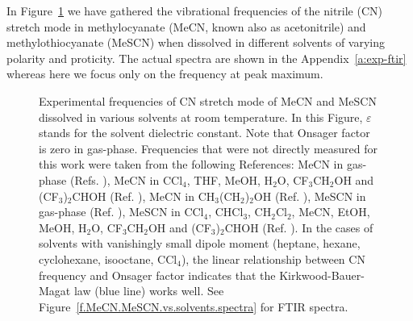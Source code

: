 \documentclass[b5paper,oneside,fleqn,11pt]{book}
\begin{document}
\begin{refsection}
In Figure~\ref{f.MeCN.MeSCN.vs.solvents} we have gathered the vibrational 
frequencies of the nitrile (CN) stretch mode in methylocyanate (MeCN, known also as acetonitrile) and methylothiocyanate
(MeSCN) when dissolved in different solvents of varying polarity and proticity. \citep{Blasiak.Ritchie.Webb.Cho.PCCP.2016}
The actual spectra are shown in the Appendix~\ref{a:exp-ftir} whereas here we focus only
on the frequency at peak maximum.
%
\begin{figure}[ht]
\centering
\setlength\fboxsep{0.4pt}
\setlength\fboxrule{0.5pt}
\caption{Experimental frequencies of CN stretch mode of MeCN and MeSCN dissolved in
various solvents at room temperature. In this Figure, $\varepsilon$
stands for the solvent dielectric constant. Note that Onsager factor is zero in gas-phase. 
Frequencies that were not directly measured for this work were taken from the following 
References: MeCN in gas\hyp{}phase 
(Refs. \citep{Koga.Kondo.Saeki.Person.JPC.1984,Cerceau.Raulin.Courtin.Gautier.Icarus.1985,
Parker.Nielsen.Fletcher.JMS.1957}), 
MeCN in CCl$_4$, THF, MeOH, H$_2$O, CF$_3$CH$_2$OH and 
(CF$_3$)$_2$CHOH (Ref. \citep{Eaton.Pena-Nunez.Symons.JChemSocFaradTrans1.1988}), 
MeCN in CH$_3$(CH$_2$)$_2$OH (Ref. \citep{Oh.Choi.Lee.Han.Lee.Cho.JCP.2008}), 
MeSCN in gas-phase (Ref. \citep{Sullivan.Heusel.Durig.JMS.1984}), MeSCN in 
CCl$_4$, CHCl$_3$, CH$_2$Cl$_2$, MeCN, EtOH, MeOH, H$_2$O, CF$_3$CH$_2$OH and (CF$_3$)$_2$CHOH 
(Ref. \citep{Maienschein-Cline.Londergan.JPCA.2007}). In the 
cases of solvents with vanishingly small dipole moment (heptane, hexane, cyclohexane, 
isooctane, CCl$_4$), the linear relationship between CN frequency and Onsager factor indicates that 
the Kirkwood-Bauer-Magat law (blue line) works well. 
See Figure~\ref{f.MeCN.MeSCN.vs.solvents.spectra} for FTIR spectra.
\label{f.MeCN.MeSCN.vs.solvents}}
\end{figure}
%


\end{refsection}
\end{document}
